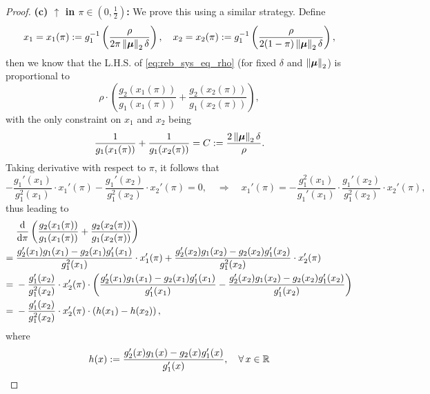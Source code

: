\begin{proof}
\vspace{0.5\baselineskip}
\noindent
\textbf{(c) $\boldsymbol{\uparrow}$ in $\pi \in (0, \frac12)$:}
We prove this using a similar strategy. Define
	\begin{equation*}
		x_1 = x_1 (\pi) := g_1^{-1} \left( \frac{\rho}{2 \pi \left\|{\text{\boldmath $\mu$}}\right\|_2 \delta} \right), 
            \quad
            x_2 = x_2 (\pi) := g_1^{-1} \left( \frac{\rho}{2(1 - \pi) \left\|{\text{\boldmath $\mu$}}\right\|_2 \delta} \right),
	\end{equation*}
	then we know that the L.H.S. of \cref{eq:reb_sys_eq_rho} (for fixed $\delta$ and $\left\|{\text{\boldmath $\mu$}}\right\|_2$) is proportional to
	\begin{equation}\label{eq:rho_LHS_prop}
        \rho \cdot \left(
		\frac{g_2 (x_1(\pi))}{g_1 (x_1(\pi))} + \frac{g_2 (x_2(\pi))}{g_1 (x_2(\pi))}
        \right),
	\end{equation}
	with the only constraint on $x_1$ and $x_2$ being
	\begin{equation*}
		\frac{1}{g_1 (x_1(\pi))} + \frac{1}{g_1 (x_2(\pi))} = C := \frac{2 \left\|{\text{\boldmath $\mu$}}\right\|_2 \delta}{\rho}.
	\end{equation*}
	Taking derivative with respect to $\pi$, it follows that
	\begin{equation*}
		- \frac{g_1' (x_1)}{g_1^2 (x_1)} \cdot x_1'(\pi) - \frac{g_1' (x_2)}{g_1^2 (x_2)} \cdot x_2' (\pi) = 0, 
        \quad
        \Longrightarrow 
        \quad x_1' (\pi) = - \frac{g_1^2 (x_1)}{g_1' (x_1)} \cdot \frac{g_1' (x_2)}{g_1^2 (x_2)}  \cdot x_2'(\pi),
	\end{equation*}
	thus leading to
	\begin{align*}
		& \frac{\textup{d}}{\textup{d} \pi} \left( \frac{g_2 (x_1(\pi))}{g_1 (x_1(\pi))} + \frac{g_2 (x_2(\pi))}{g_1 (x_2(\pi))} \right) \\
		= {} & \frac{g_2'(x_1) g_1(x_1) - g_2(x_1) g_1'(x_1)}{g_1^2(x_1)} \cdot x_1'(\pi) + \frac{g_2'(x_2) g_1(x_2) - g_2(x_2) g_1'(x_2)}{g_1^2(x_2)} \cdot x_2'(\pi) \\
		= {} & - \frac{g_1' (x_2)}{g_1^2(x_2)} \cdot x_2'(\pi) \cdot \left( \frac{g_2'(x_1) g_1(x_1) - g_2(x_1) g_1'(x_1)}{g_1' (x_1)} - \frac{g_2'(x_2) g_1(x_2) - g_2(x_2) g_1'(x_2)}{g_1' (x_2)} \right) \\
            = {} & - \frac{g_1' (x_2)}{g_1^2(x_2)} \cdot x_2'(\pi) \cdot \left( h(x_1) - h(x_2) \right),
	\end{align*}
        where 
        \begin{equation*}
		h(x) := \frac{g_2'(x) g_1(x) - g_2(x) g_1'(x)}{g_1'(x)}, \quad \forall\, x \in \R

\end{equation*}
\end{proof}
